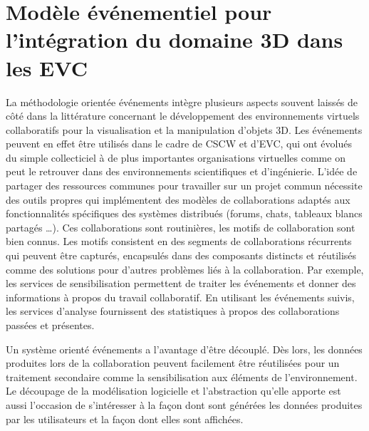 
\section{Modèle événementiel pour l'intégration du domaine 3D dans les 
EVC}
\label{sec:modele_event}
La méthodologie orientée événements intègre plusieurs aspects souvent laissés 
de côté dans la littérature concernant le développement des environnements 
virtuels collaboratifs pour la visualisation et la manipulation d'objets 3D. 
Les événements peuvent en effet être utilisés dans le cadre de \gls{CSCW} et 
d'\gls{EVC}, qui ont évolués du simple collecticiel à de plus importantes 
organisations virtuelles comme on peut le retrouver dans des environnements 
scientifiques et d'ingénierie. L'idée de partager des ressources communes pour 
travailler sur un projet commun nécessite des outils propres qui implémentent 
des modèles de collaborations adaptés aux fonctionnalités spécifiques des 
systèmes distribués (forums, chats, tableaux blancs partagés \dots). Ces 
collaborations sont routinières, les motifs de collaboration sont bien connus. Les 
motifs consistent en des segments de collaborations récurrents qui peuvent être 
capturés, encapsulés dans des composants distincts et réutilisés comme des 
solutions pour d'autres problèmes liés à la collaboration. Par exemple, les services 
de sensibilisation permettent de traiter les événements et donner des informations 
à propos du travail collaboratif. En utilisant les événements suivis, les services 
d'analyse fournissent des statistiques à propos des collaborations passées et 
présentes.


Un système orienté événements a l'avantage d'être découplé. Dès 
lors, les données produites lors de la collaboration peuvent facilement être 
réutilisées pour un traitement secondaire comme la sensibilisation aux éléments 
de l'environnement. 
Le découpage de la modélisation logicielle et l'abstraction qu'elle apporte est aussi 
l'occasion de s'intéresser à la façon dont sont générées les données produites par 
les utilisateurs et la façon dont elles sont affichées. 

